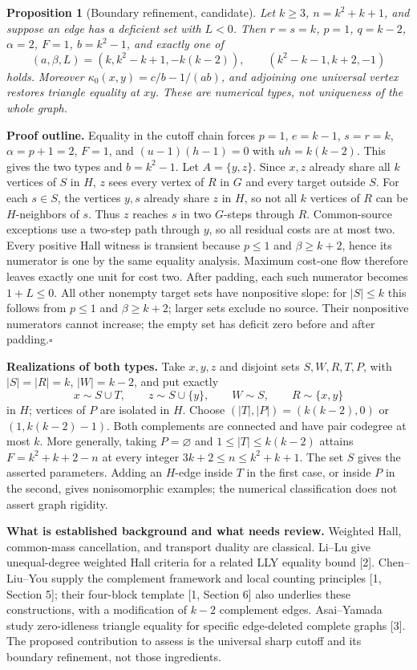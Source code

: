 \documentclass[10pt]{article}
\newtheorem{proposition}{Proposition}
\begin{document}
\newpage
\begin{proposition}[Boundary refinement, candidate]
Let $k\ge3$, $n=k^2+k+1$, and suppose an edge has a deficient set with $L<0$.
Then $r=s=k$, $p=1$, $q=k-2$, $\alpha=2$, $F=1$, $b=k^2-1$, and exactly one of
\[
 (a,\beta,L)=(k,k^2-k+1,-k(k-2)),\qquad
 (k^2-k-1,k+2,-1)
\]
holds. Moreover $\kappa_0(x,y)=c/b-1/(ab)$, and adjoining one universal vertex restores triangle equality at $xy$.
These are numerical types, not uniqueness of the whole graph.
\end{proposition}
\textbf{Proof outline.}
Equality in the cutoff chain forces $p=1$, $e=k-1$, $s=r=k$,
$\alpha=p+1=2$, $F=1$, and $(u-1)(h-1)=0$ with $uh=k(k-2)$.
This gives the two types and $b=k^2-1$.
Let $A=\{y,z\}$. Since $x,z$ already share all $k$ vertices of $S$ in $H$,
$z$ sees every vertex of $R$ in $G$ and every target outside $S$.
For each $s\in S$, the vertices $y,s$ already share $z$ in $H$, so not all $k$ vertices of $R$ can be $H$-neighbors of $s$.
Thus $z$ reaches $s$ in two $G$-steps through $R$.
Common-source exceptions use a two-step path through $y$, so all residual costs are at most two. Every positive Hall witness is transient because $p\le1$ and $\beta\ge k+2$, hence its numerator is one by the same equality analysis.
Maximum cost-one flow therefore leaves exactly one unit for cost two.
After padding, each such numerator becomes $1+L\le0$.
All other nonempty target sets have nonpositive slope: for $|S|\le k$ this follows from $p\le1$ and $\beta\ge k+2$; larger sets exclude no source.
Their nonpositive numerators cannot increase; the empty set has deficit zero before and after padding.\hfill$\square$

\textbf{Realizations of both types.}
Take $x,y,z$ and disjoint sets $S,W,R,T,P$, with
$|S|=|R|=k$, $|W|=k-2$, and put exactly
\[
 x\sim S\cup T,\qquad z\sim S\cup\{y\},\qquad W\sim S,\qquad R\sim\{x,y\}
\]
in $H$; vertices of $P$ are isolated in $H$.
Choose $(|T|,|P|)=(k(k-2),0)$ or $(1,k(k-2)-1)$.
Both complements are connected and have pair codegree at most $k$. More generally, taking $P=\varnothing$ and $1\le |T|\le k(k-2)$ attains $F=k^2+k+2-n$ at every integer $3k+2\le n\le k^2+k+1$.
The set $S$ gives the asserted parameters. Adding an $H$-edge inside $T$ in the first case, or inside $P$ in the second, gives nonisomorphic examples; the numerical classification does not assert graph rigidity.

\textbf{What is established background and what needs review.}
Weighted Hall, common-mass cancellation, and transport duality are classical.
Li--Lu give unequal-degree weighted Hall criteria for a related LLY equality bound [2].
Chen--Liu--You supply the complement framework and local counting principles [1, Section 5]; their four-block template [1, Section 6] also underlies these constructions, with a modification of $k-2$ complement edges.
Asai--Yamada study zero-idleness triangle equality for specific edge-deleted complete graphs [3].
The proposed contribution to assess is the universal sharp cutoff and its boundary refinement, not those ingredients.
\end{document}
